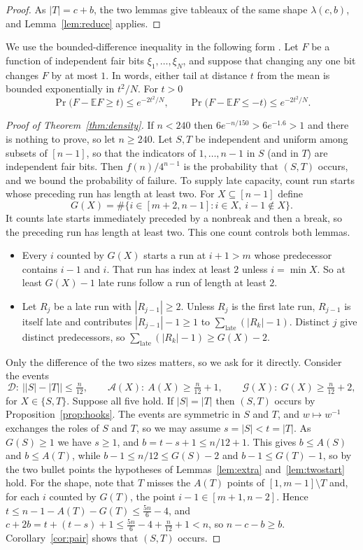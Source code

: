 \documentclass[12pt]{article}
\numberwithin{theorem}{section}
\numberwithin{equation}{section}
\begin{document}
\begin{proof}
As $|T|=c+b$, the two lemmas give tableaux of the same shape $\lambda(c,b)$, and Lemma~\ref{lem:reduce}
applies.
\end{proof}

We use the bounded-difference inequality in the following form \cite{hoeffding,mcdiarmid}. Let $F$ be a
function of independent fair bits $\xi_1,\dots,\xi_N$, and suppose that changing any one bit changes $F$ by
at most $1$. In words, either tail at distance $t$ from the mean is bounded exponentially in $t^2/N$. For $t>0$
\begin{equation}\label{eq:mcd}
\Pr\bigl(F-\mathbb{E}F\ge t\bigr)\le e^{-2t^2/N},\qquad \Pr\bigl(F-\mathbb{E}F\le -t\bigr)\le e^{-2t^2/N}.
\end{equation}

\begin{proof}[Proof of Theorem~\ref{thm:density}]
If $n<240$ then $6e^{-n/150}>6e^{-1.6}>1$ and there is nothing to prove, so let $n\ge240$. Let $S,T$ be
independent and uniform among subsets of $[n-1]$, so that the indicators of $1,\dots,n-1$ in $S$ (and in
$T$) are independent fair bits. Then $f(n)/4^{n-1}$ is the probability that $(S,T)$ occurs, and we bound the
probability of failure. To supply late capacity, count run starts whose preceding run has length at least two. For $X\subseteq[n-1]$ define
\[
G(X)=\#\{i\in[m+2,n-1]: i\in X,\ i-1\notin X\}.
\]
It counts late starts immediately preceded by a nonbreak and then a break, so the preceding run has length at least two. This one count controls both lemmas.
\begin{itemize}
\item Every $i$ counted by $G(X)$ starts a run at $i+1>m$ whose predecessor contains $i-1$ and $i$. That run
has index at least $2$ unless $i=\min X$. So at least $G(X)-1$ late runs follow a run of length at least $2$.
\item Let $R_j$ be a late run with $|R_{j-1}|\ge2$. Unless $R_j$ is the first late run, $R_{j-1}$ is itself
late and contributes $|R_{j-1}|-1\ge1$ to $\sum_{\mathrm{late}}(|R_k|-1)$. Distinct $j$ give distinct
predecessors, so $\sum_{\mathrm{late}}(|R_k|-1)\ge G(X)-2$.
\end{itemize}
Only the difference of the two sizes matters, so we ask for it directly. Consider the events
\[
\mathcal{D}:\ \bigl||S|-|T|\bigr|\le\tfrac{n}{12},\qquad
\mathcal{A}(X):\ A(X)\ge\tfrac n{12}+1,\qquad
\mathcal{G}(X):\ G(X)\ge\tfrac n{12}+2,
\]
for $X\in\{S,T\}$. Suppose all five hold. If $|S|=|T|$ then $(S,T)$ occurs by Proposition~\ref{prop:hooks}. The events are
symmetric in $S$ and $T$, and $w\mapsto w^{-1}$ exchanges the roles of $S$ and $T$, so we may assume
$s=|S|<t=|T|$. As $G(S)\ge1$ we have $s\ge1$, and $b=t-s+1\le n/12+1$. This gives $b\le A(S)$ and $b\le A(T)$, while
$b-1\le n/12\le G(S)-2$ and $b-1\le G(T)-1$, so by the two bullet points the hypotheses of
Lemmas~\ref{lem:extra} and~\ref{lem:twostart} hold. For the shape, note that $T$ misses the $A(T)$ points of
$[1,m-1]\setminus T$ and, for each $i$ counted by $G(T)$, the point $i-1\in[m+1,n-2]$. Hence
$t\le n-1-A(T)-G(T)\le\tfrac{5n}{6}-4$, and
$c+2b=t+(t-s)+1\le\tfrac{5n}{6}-4+\tfrac{n}{12}+1<n$, so $n-c-b\ge b$. Corollary~\ref{cor:pair} shows that $(S,T)$ occurs.


\end{proof}
\end{document}
